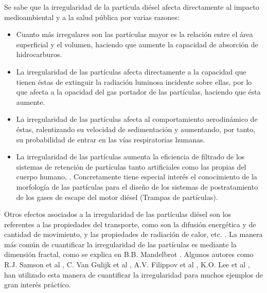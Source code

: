 \par Se sabe que la irregularidad de la partícula diésel afecta directamente al impacto medioambiental y a la salud pública por varias razones:
 
\begin{itemize}
\item Cuanto más irregulares son las partículas mayor es la relación entre el área superficial y el volumen, haciendo que aumente la capacidad de absorción de hidrocarburos. 

\item La irregularidad de las partículas afecta directamente a la capacidad que tienen éstas de extinguir la radiación luminosa incidente sobre ellas, por lo que afecta a la opacidad del gas portador de las partículas, haciendo que ésta aumente.

\item La irregularidad de las partículas afecta al comportamiento aerodinámico de éstas, ralentizando su velocidad de sedimentación y aumentando, por tanto, su probabilidad de entrar en las vías respiratorias humanas.

\item La irregularidad de las partículas aumenta la eficiencia de filtrado de los sistemas de retención de partículas tanto artificiales como las propias del cuerpo humano, \cite{bockhornetal:2002}. Concretamente tiene especial interés el conocimiento de la morfología de las partículas para el diseño de los sistemas de postratamiento de los gases de escape del motor diésel (Trampas de partículas).

\end{itemize}

Otros efectos asociados a la irregularidad de las partículas diésel son los referentes a las propiedades del transporte, como son la difusión energética y de cantidad de movimiento, y las propiedades de radiación de calor, etc. \cite{meakinetal:1989}. 
La manera más común de cuantificar la irregularidad de las partículas es mediante la dimensión fractal, como se explica en B.B. Mandelbrot \cite{mandelbrot:1983}. Algunos autores como R.J. Samson et al \cite{samsometal:1987}, C. Van Gulijk et al \cite{vangulijketal:2004}, A.V. Filippov et al \cite{filippovetal:2000}, K.O. Lee et al \cite{leeetal:2003}, han utilizado esta manera de cuantificar la irregularidad para muchos ejemplos de gran interés práctico.

